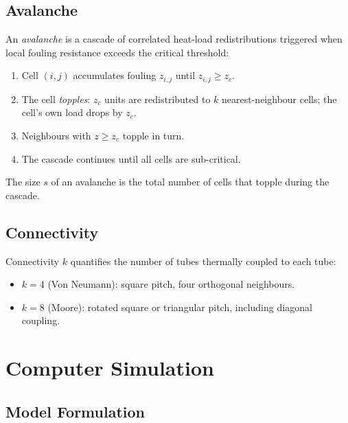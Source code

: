 \documentclass[10pt,a4paper,twocolumn]{article}
\begin{document}
\subsection{Avalanche}

An \emph{avalanche} is a cascade of correlated heat-load redistributions
triggered when local fouling resistance exceeds the critical threshold:
\begin{enumerate}
  \item Cell $(i,j)$ accumulates fouling $z_{i,j}$ until $z_{i,j}\geq z_c$.
  \item The cell \emph{topples}: $z_c$ units are redistributed to $k$
        nearest-neighbour cells; the cell's own load drops by $z_c$.
  \item Neighbours with $z\geq z_c$ topple in turn.
  \item The cascade continues until all cells are sub-critical.
\end{enumerate}
The size $s$ of an avalanche is the total number of cells that topple during
the cascade.

\subsection{Connectivity}

Connectivity $k$ quantifies the number of tubes thermally coupled to each
tube:
\begin{itemize}
  \item $k=4$ (Von Neumann): square pitch, four orthogonal neighbours.
  \item $k=8$ (Moore): rotated square or triangular pitch, including diagonal
        coupling.
\end{itemize}

\section{Computer Simulation}
\label{sec:simulation}

\subsection{Model Formulation}
\end{document}
